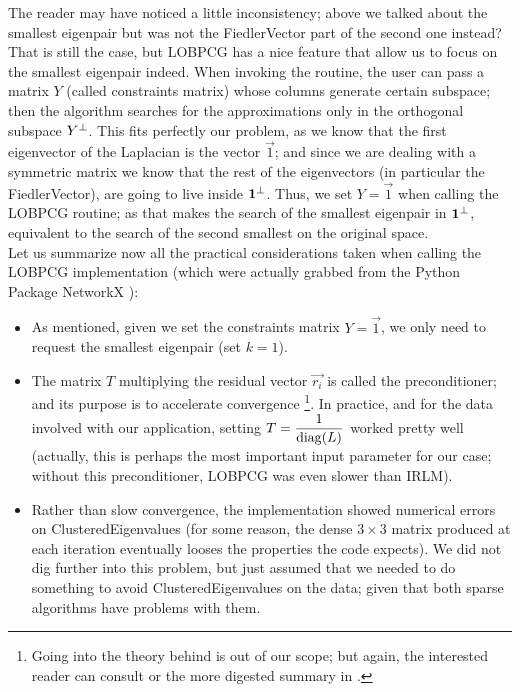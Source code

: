 The reader may have noticed a little inconsistency; above we talked about
the smallest eigenpair but was not the \gls{FiedlerVector} part of the
second one instead? That is still the case, but \gls{LOBPCG} has a nice
feature that allow us to focus on the smallest eigenpair indeed. When
invoking the routine, the user can pass a matrix $Y$ (called
constraints matrix) whose columns
generate certain subspace; then the algorithm searches for the
approximations only in the orthogonal subspace ${Y}^{\bot}$. This fits
perfectly our problem, as we know that the first eigenvector of the
\gls{Laplacian} is the vector $\vec{1}$; and since we are dealing with a
symmetric matrix we know that the rest of the eigenvectors (in
particular the \gls{FiedlerVector}), are going to live inside
${\mathbf{1}}^{\bot}$. Thus, we set $Y = \vec{1}$ when calling the \gls{LOBPCG}
routine; as that makes the search of the smallest eigenpair in
${\mathbf{1}}^{\bot}$, equivalent to the search of the second smallest on
the original space. \\

Let us summarize now all the practical considerations taken when
calling the \gls{LOBPCG} implementation (which were actually grabbed from the
Python Package NetworkX \cite{networkx}):

\begin{itemize}
\item As mentioned, given we set the constraints matrix $Y = \vec{1}$,
  we only need to request the smallest eigenpair (set $k=1$). 
\item The matrix $T$ multiplying the residual vector $\vec{r_i}$ is called
  the preconditioner; and its purpose is to accelerate
  convergence \footnote{Going into the theory behind is out of
    our scope; but again,  the interested reader can consult \cite{knyazev01}
    or the more digested summary in \cite{lashuk07}.}. In practice, and for the
  data involved with our application, setting $T =
  \dfrac{1}{\operatorname{diag}(L)}$ worked pretty well (actually, this is
  perhaps the most important input parameter for our case; without
  this preconditioner, \gls{LOBPCG} was even slower than \gls{IRLM}). 
\item Rather than slow convergence, the implementation showed
  numerical errors on \gls{ClusteredEigenvalues} (for some reason, the
  dense $3 \times 3$ matrix produced at each iteration eventually
  looses the properties the code expects). We did not dig further into
  this problem, but just assumed that we needed to do something to
  avoid \gls{ClusteredEigenvalues} on the data; given that both sparse
  algorithms have problems with them.
\end{itemize}

